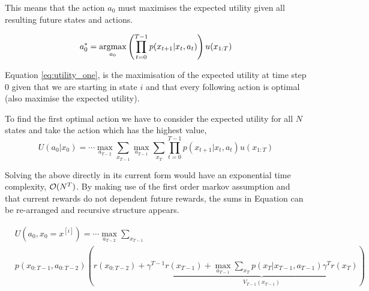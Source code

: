 

This means that the action $a_0$ must maximises the expected utility given all resulting future states and actions. 

\begin{equation}\label{eq:utility_one}
  a^*_0 =  \argmax_{a_0}  \left( \prod_{t=0}^{T-1} p(x_{t+1}|x_t,a_t) \right) u(x_{1:T})
\end{equation}

Equation \ref{eq:utility_one}, is the maximisation of the expected utility at time step $0$ given that we are 
starting in state $i$ and that every following action is optimal (also maximise the expected 
utility). 


To find the first optimal action we have to consider the expected utility for all $N$ states and take the action which has the highest value,
\begin{equation}\label{eq:max_util}
  U(a_0|x_0) =  \cdots \max_{a_{T-2}} \sum\limits_{x_{T-1}} \max_{a_{T-1}}  \sum\limits_{x_T}  \prod_{t=0}^{T-1} p(x_{t+1}|x_t,a_t) u(x_{1:T})
\end{equation}

Solving the above directly in its current form would have an exponential time complexity, $\operatorname{\mathcal{O}}(N^T)$. By making use of the first order 
markov assumption and that current rewards do not dependent future rewards, the sums in Equation \label{eq:max_util} can be re-arranged and 
recursive structure appears. 


\begin{align}
 &U(a_0,x_0=x^{[i]}) =\cdots \max_{a_{T-2}} \sum\limits_{x_{T-1}}  \nonumber\\
 &p(x_{0:T-1},a_{0:T-2})  \left( r(x_{0:T-2}) + \gamma^{T-1} \underbrace{r(x_{T-1}) +  \max_{a_{T-1}} \sum\limits_{x_{T}} p(x_{T}|x_{T-1},a_{T-1}) \gamma^{T} r(x_{T})}_{V_{T-1}(x_{T-1})} \right)
\end{align}


